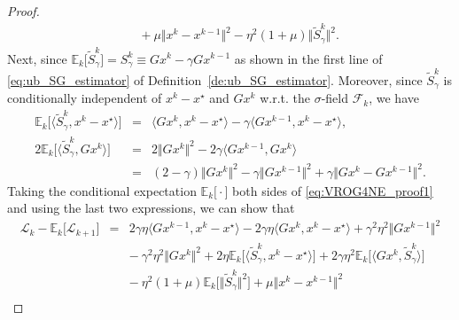 \documentclass{article}
\newcommand{\norms}[1]{\Vert#1\Vert}
\newcommand{\iprods}[1]{\langle #1\rangle}
\newcommand{\Expsk}[2]{\mathbb{E}_{#1}\big[#2\big]}
\newcommand{\Lc}{\mathcal{L}}
\newcommand{\Fc}{\mathcal{F}}
\theoremstyle{plain}
\theoremstyle{definition}
\theoremstyle{remark}
\begin{document}
\begin{proof}
\begin{equation}
\begin{array}{lcl}
&& +  {~} \mu \norms{x^k - x^{k-1}}^2 - \eta^2(1 + \mu) \norms{\widetilde{S}_{\gamma}^k}^2.
\end{array}
\end{equation}
Next, since $\Expsk{k}{\widetilde{S}^k_{\gamma}} = S_{\gamma}^k \equiv Gx^k - \gamma Gx^{k-1}$ as shown in the first line of \eqref{eq:ub_SG_estimator} of Definition~\ref{de:ub_SG_estimator}.
Moreover, since $\widetilde{S}^k_{\gamma}$ is conditionally independent of $x^k-x^{\star}$ and $Gx^k$ w.r.t. the $\sigma$-field $\Fc_k$, we have 
\begin{equation*} 
\begin{array}{lcl}
\Expsk{k}{ \iprods{\widetilde{S}^k_{\gamma}, x^k - x^{\star}} } &= & \iprods{Gx^k, x^k - x^{\star}} - \gamma\iprods{Gx^{k-1}, x^k - x^{\star}}, \\
2\Expsk{k}{ \iprods{\widetilde{S}^k_{\gamma}, Gx^k} } & = &  2 \norms{Gx^k}^2 - 2\gamma \iprods{Gx^{k-1}, Gx^k} \\
& = & (2 - \gamma) \norms{Gx^k}^2 - \gamma\norms{Gx^{k-1}}^2 + \gamma\norms{Gx^k - Gx^{k-1}}^2.
\end{array}
\end{equation*}
Taking the conditional expectation $\Expsk{k}{\cdot}$ both sides of \eqref{eq:VROG4NE_proof1} and using the last two expressions, we can show that
\begin{equation*} 
\begin{array}{lcl}
\Lc_k - \Expsk{k}{ \Lc_{k+1} }
& = & 2\gamma\eta\iprods{Gx^{k-1}, x^k - x^{\star}}  - 2\gamma\eta \iprods{Gx^k, x^k - x^{\star} } +  \gamma^2\eta^2\norms{Gx^{k-1}}^2 \\
&& - {~} \gamma^2\eta^2\norms{Gx^k}^2 + 2\eta \Expsk{k}{ \iprods{\widetilde{S}^k_{\gamma}, x^k - x^{\star}} } + 2\gamma\eta^2 \Expsk{k}{ \iprods{Gx^k, \widetilde{S}^k_{\gamma} }}  \\
&& - {~}  \eta^2(1 + \mu)  \Expsk{k}{ \norms{\widetilde{S}^k _{\gamma} }^2 }  +   \mu \norms{x^k - x^{k-1}}^2 \\

\end{array}
\end{equation*}
\end{proof}
\end{document}
